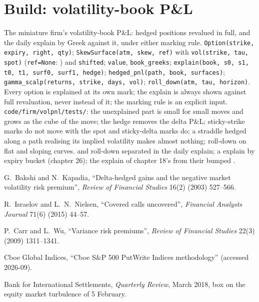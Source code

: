 \section{Build: volatility-book P\&L}\label{bld:dv:trading-volatility:volpnl}

\begin{build}
 The miniature firm's volatility-book P\&L: hedged positions revalued in full, and the daily explain by Greek against it, under
either marking rule.
 \texttt{Option(strike, expiry, right, qty)}; \texttt{SkewSurface(atm, skew, ref)} with \texttt{vol(strike, tau, spot)}
(\texttt{ref=None}: ) and \texttt{shifted}; \texttt{value}, \texttt{book\_greeks}; \texttt{explain(book, s0, s1, t0, t1, surf0, surf1,
hedge)}; \texttt{hedged\_pnl(path, book, surfaces)}; \texttt{gamma\_scalp(returns, strike, days, vol)}; \texttt{roll\_down(atm, tau, horizon)}.
 Every option is explained at its own mark; the explain is always shown against full revaluation, never instead of it; the marking
rule is an explicit input.
 \texttt{code/firm/volpnl/tests/}: the unexplained part is small for small moves and grows as the cube of the move; the
hedge removes the delta P\&L; sticky-strike marks do not move with the spot and sticky-delta marks do; a straddle hedged along a path realising its
implied volatility makes almost nothing; roll-down on flat and sloping curves.
  and roll-down separated in the daily explain; a  explain by expiry bucket (chapter 26); the explain of chapter 18's
 from their bumped .
\end{build}

\begin{omsources}
\item G.~Bakshi and N.~Kapadia, ``Delta-hedged gains and the negative market volatility risk premium'', \emph{Review of Financial Studies} 16(2)
(2003) 527--566.
\item R.~Israelov and L.~N.~Nielsen, ``Covered calls uncovered'', \emph{Financial Analysts Journal} 71(6) (2015) 44--57.
\item P.~Carr and L.~Wu, ``Variance risk premiums'', \emph{Review of Financial Studies} 22(3) (2009) 1311--1341.
\item Cboe Global Indices, ``Cboe S\&P 500 PutWrite Indices methodology'' (accessed 2026-09).
\item Bank for International Settlements, \emph{Quarterly Review}, March 2018, box on the equity market turbulence of 5 February.
\end{omsources}

